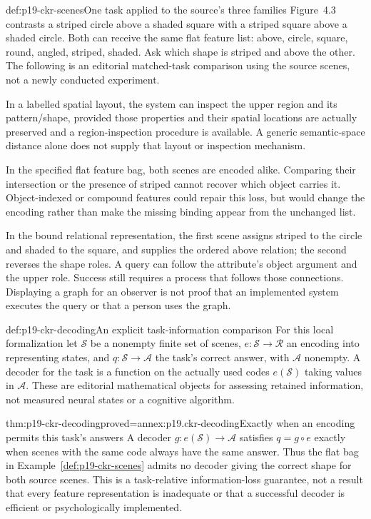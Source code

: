 \begin{hbexample}{def:p19-ckr-scenes}{One task applied to the source's three families}
Figure~4.3 contrasts a striped circle above a shaded square with
a striped square above a shaded circle. Both can receive the same
flat feature list: above, circle, square, round, angled, striped,
shaded. Ask which shape is striped and above the other. The
following is an editorial matched-task comparison using the source
scenes, not a newly conducted experiment.

In a labelled spatial layout, the system can inspect the upper
region and its pattern/shape, provided those properties and their
spatial locations are actually preserved and a region-inspection
procedure is available. A generic semantic-space distance alone
does not supply that layout or inspection mechanism.

In the specified flat feature bag, both scenes are encoded alike.
Comparing their intersection or the presence of striped cannot
recover which object carries it. Object-indexed or compound features
could repair this loss, but would change the encoding rather than
make the missing binding appear from the unchanged list.

In the bound relational representation, the first scene assigns
striped to the circle and shaded to the square, and supplies the
ordered above relation; the second reverses the shape roles.
A query can follow the attribute's object argument and the upper
role. Success still requires a process that follows those connections.
Displaying a graph for an observer is not proof that an implemented
system executes the query or that a person uses the graph.
\end{hbexample}

\begin{hbdefinition}{def:p19-ckr-decoding}{An explicit task-information comparison}
For this local formalization let \(\mathcal S\) be a nonempty
finite set of scenes, \(e:\mathcal S\to\mathcal R\) an encoding
into representing states, and \(q:\mathcal S\to\mathcal A\)
the task's correct answer, with \(\mathcal A\) nonempty.
A decoder for the task is a function on the actually used codes
\(e(\mathcal S)\) taking values in \(\mathcal A\).
These are editorial mathematical objects for assessing retained
information, not measured neural states or a cognitive algorithm.
\end{hbdefinition}

\begin{hbtheorem}{thm:p19-ckr-decoding}{proved=annex:p19.ckr-decoding}{Exactly when an encoding permits this task's answers}
A decoder \(g:e(\mathcal S)\to\mathcal A\) satisfies
\(q=g\circ e\) exactly when scenes with the same code always
have the same answer. Thus the flat bag in
Example~\ref{def:p19-ckr-scenes} admits no decoder giving the
correct shape for both source scenes. This is a task-relative
information-loss guarantee, not a result that every feature
representation is inadequate or that a successful decoder is
efficient or psychologically implemented.
\end{hbtheorem}

